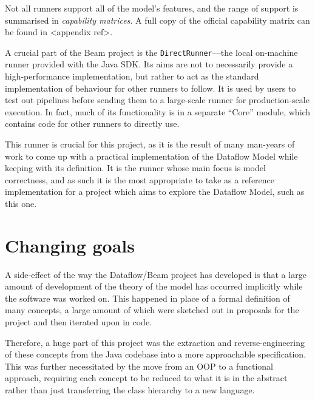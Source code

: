 Not all runners support all of the model's features, and the range of support is summarised in \emph{capability matrices}.
A full copy of the official capability matrix can be found in <appendix ref>.



A crucial part of the Beam project is the \verb|DirectRunner|---the local on-machine runner provided with the Java SDK.
Its aims are not to necessarily provide a high-performance implementation, but rather to act as the standard implementation of behaviour for other runners to follow.
It is used by users to test out pipelines before sending them to a large-scale runner for production-scale execution.
In fact, much of its functionality is in a separate ``Core'' module, which contains code for other runners to directly use.

This runner is crucial for this project, as it is the result of many man-years of work to come up with a practical implementation of the Dataflow Model while keeping with its definition.
It is the runner whose main focus is model correctness, and as such it is the most appropriate to take as a reference implementation for a project which aims to explore the Dataflow Model, such as this one.


\section{Changing goals}

A side-effect of the way the Dataflow/Beam project has developed is that a large amount of development of the theory of the model has occurred implicitly while the software was worked on.
This happened in place of a formal definition of many concepts, a large amount of which were sketched out in proposals for the project and then iterated upon in code.

Therefore, a huge part of this project was the extraction and reverse-engineering of these concepts from the Java codebase into a more approachable specification.
This was further necessitated by the move from an OOP to a functional approach, requiring each concept to be reduced to what it is in the abstract rather than just transferring the class hierarchy to a new language.


